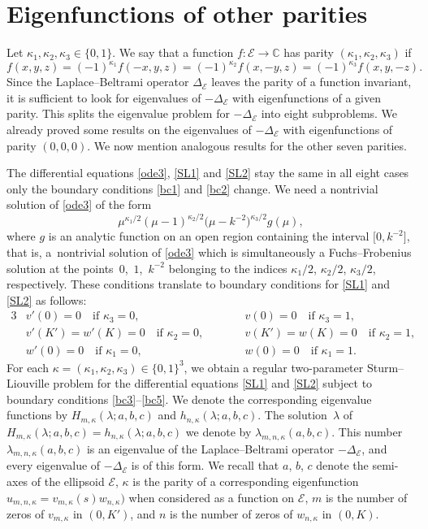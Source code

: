 \documentclass[pdftex]{sigma}
\newcommand{\C}{\mathbb{C}}
\newcommand{\E}{\mathcal{E}}
\newcommand{\D}{\Delta_\E}
\numberwithin{equation}{section}
\begin{document}
\section{Eigenfunctions of other parities}\label{other}

Let $\kappa_1,\kappa_2,\kappa_3\in\{0,1\}$. We say that a function $f\colon \E\to\C$ has parity $(\kappa_1,\kappa_2,\kappa_3)$
if
\[ f(x,y,z)=(-1)^{\kappa_1}f(-x,y,z)=(-1)^{\kappa_2}f(x,-y,z)=(-1)^{\kappa_3}f(x,y,-z).\]
Since the Laplace--Beltrami operator $\D$ leaves the parity of a function invariant, it is
sufficient to look for eigenvalues of $-\D$ with eigenfunctions of a given parity.
This splits the eigenvalue problem for $-\D$ into eight subproblems.
We already proved some results on the eigenvalues of $-\D$ with eigenfunctions of parity $(0,0,0)$.
We now mention analogous results for the other seven parities.

The differential equations \eqref{ode3}, \eqref{SL1} and \eqref{SL2} stay the same in all eight cases only the boundary conditions \eqref{bc1} and \eqref{bc2} change.
We need a nontrivial solution of \eqref{ode3} of the form
\[ \mu^{\kappa_1/2}(\mu-1)^{\kappa_2/2}\bigl(\mu-k^{-2}\bigr)^{\kappa_3/2} g(\mu),\]
where $g$ is an analytic function on an open region containing the interval $\bigl[0,k^{-2}\bigr]$, that is,
a~nontrivial solution of \eqref{ode3} which is simultaneously a Fuchs--Frobenius solution at the points~$0$,~$1$,~$k^{-2}$
belonging to the indices $\kappa_1/2$, $\kappa_2/2$, $\kappa_3/2$, respectively.
These conditions translate to boundary conditions for \eqref{SL1} and \eqref{SL2}
as follows:
\begin{alignat}{3}
&v'(0)=0 \quad \text{if $\kappa_3=0$}, && v(0)=0 \quad \text{if $\kappa_3=1$}\label{bc3}, &\\
&v'(K')=w'(K)=0 \quad \text{if $\kappa_2=0$},\qquad && v(K')=w(K)=0 \quad \text{if $\kappa_2=1$}\label{bc4}, &\\
&w'(0)=0 \quad \text{if $\kappa_1=0$}, && w(0)=0 \quad \text{if $\kappa_1=1$}.\label{bc5} &
\end{alignat}
For each $\kappa=(\kappa_1,\kappa_2,\kappa_3)\in\{0,1\}^3$, we obtain a regular two-parameter Sturm--Liouville problem for the differential equations \eqref{SL1} and \eqref{SL2} subject to boundary conditions \eqref{bc3}--\eqref{bc5}.
We denote the corresponding eigenvalue functions by $H_{m,\kappa}(\lambda;a,b,c)$ and $h_{n,\kappa}(\lambda;a,b,c)$.
The solution~$\lambda$ of $H_{m,\kappa}(\lambda;a,b,c)=h_{n,\kappa}(\lambda;a,b,c)$
we denote by $\lambda_{m,n,\kappa}(a,b,c)$. This number $\lambda_{m,n,\kappa}(a,b,c)$ is an eigenvalue of the Laplace--Beltrami operator $-\D$, and every eigenvalue of $-\D$ is of this form.
We recall that $a$, $b$, $c$ denote the semi-axes of the ellipsoid $\E$, $\kappa$ is the parity of a corresponding eigenfunction
$u_{m,n,\kappa}=v_{m,\kappa}(s)w_{n,\kappa})$ when considered as a function on $\E$,
$m$ is the number of zeros of $v_{m,\kappa}$ in $(0,K')$, and $n$ is the number of zeros of $w_{n,\kappa}$ in $(0,K)$.
\end{document}
